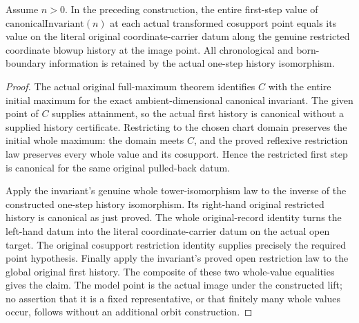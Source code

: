 \begin{theorem}
\label{hir:general-nc-first-step-whole-canonical-chart-value}
\leanok
{}
Assume $n>0$. In the preceding construction, the entire first-step value
of $\mathrm{canonicalInvariant}(n)$ at each actual transformed cosupport
point equals its value on the literal original coordinate-carrier datum
along the genuine restricted coordinate blowup history at the image
point. All chronological and born-boundary information is retained by
the actual one-step history isomorphism.
\end{theorem}
\begin{proof}
The actual original full-maximum theorem identifies $C$ with the entire
initial maximum for the exact ambient-dimensional canonical invariant.
The given point of $C$ supplies attainment, so the actual first history
is canonical without a supplied history certificate. Restricting to the
chosen chart domain preserves the initial whole maximum: the domain
meets $C$, and the proved reflexive restriction law preserves every whole
value and its cosupport. Hence the restricted first step is canonical
for the same original pulled-back datum.

Apply the invariant's genuine whole tower-isomorphism law to the inverse
of the constructed one-step history isomorphism. Its right-hand original
restricted history is canonical as just proved. The whole original-record
identity turns the left-hand datum into the literal coordinate-carrier
datum on the actual open target. The original cosupport restriction
identity supplies precisely the required point hypothesis. Finally apply
the invariant's proved open restriction law to the global original first
history. The composite of these two whole-value equalities gives the
claim. The model point is the actual image under the constructed lift;
no assertion that it is a fixed representative, or that finitely many
whole values occur, follows without an additional orbit construction.
\end{proof}
